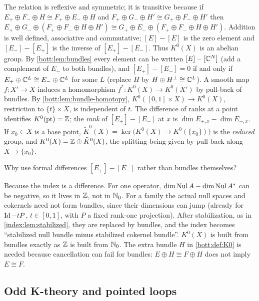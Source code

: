 The relation is reflexive and symmetric; it is transitive because if
$E_+\oplus F_-\oplus H\cong F_+\oplus E_-\oplus H$ and
$F_+\oplus G_-\oplus H'\cong G_+\oplus F_-\oplus H'$ then
$E_+\oplus G_-\oplus(F_+\oplus F_-\oplus H\oplus H')\cong
G_+\oplus E_-\oplus(F_+\oplus F_-\oplus H\oplus H')$. Addition is well defined,
associative and commutative; $[E]-[E]$ is the zero element and $[E_-]-[E_+]$ is the
inverse of $[E_+]-[E_-]$. Thus $K^0(X)$ is an abelian group. By
\cref{bott:lem:bundles} every element can be written $[E]-[\mathbb{C}^N]$ (add a complement
of $E_-$ to both bundles), and $[E_+]-[E_-]=0$ if and only if
$E_+\oplus\mathbb{C}^L\cong E_-\oplus\mathbb{C}^L$ for some $L$ (replace $H$ by $H\oplus H^\perp\cong\mathbb{C}^L$).
A smooth map $f\colon X'\to X$ induces a homomorphism $f^*\colon K^0(X)\to K^0(X')$ by
pull-back of bundles. By \cref{bott:lem:bundle-homotopy}, $K^0([0,1]\times X)\to K^0(X)$,
restriction to $\{t\}\times X$, is independent of $t$. The difference of ranks at
a point identifies $K^0(\mathrm{pt})=\mathbb{Z}$; the \emph{rank} of
$[E_+]-[E_-]$ at $x$ is $\dim E_{+,x}-\dim E_{-,x}$. If $x_0\in X$ is a base point,
$\tilde K^0(X)=\ker\big(K^0(X)\to K^0(\{x_0\})\big)$ is the \emph{reduced} group, and
$K^0(X)=\mathbb{Z}\oplus\tilde K^0(X)$, the splitting being given by pull-back along
$X\to\{x_0\}$.

\begin{question}
  Why use formal differences $[E_+]-[E_-]$ rather than bundles themselves?
\end{question}
\begin{answer}
  Because the index is a difference. For one operator, $\dim\operatorname{Nul} A-\dim\operatorname{Nul} A^*$
  can be negative, so it lives in $\mathbb{Z}$, not in $\mathbb{N}_0$. For a family the actual
  null spaces and cokernels need not form bundles, since their dimensions can
  jump (already for $\operatorname{Id}-tP$, $t\in[0,1]$, with $P$ a fixed rank-one
  projection). After stabilization, as in \cref{index:lem:stabilized}, they
  are replaced by bundles, and the index becomes ``stabilized null bundle minus
  stabilized cokernel bundle''. $K^0(X)$ is built from bundles exactly as $\mathbb{Z}$ is built from
  $\mathbb{N}_0$. The extra bundle $H$ in \cref{bott:def:K0} is needed because
  cancellation can fail for bundles: $E\oplus H\cong F\oplus H$ does not imply
  $E\cong F$.
\end{answer}

\subsection{Odd K-theory and pointed loops}


